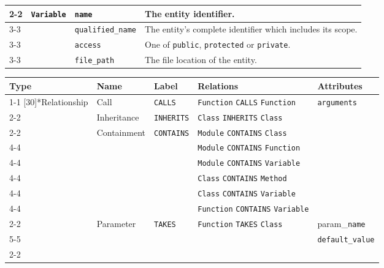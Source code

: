 \begin{tabularx}{\textwidth}{p{1.8cm}llX}
\cmidrule{2-2}\cmidrule{3-3}\cmidrule{4-4}
 & \multirow{4}[8]{*}{\texttt{Variable}} & \texttt{name} & The entity identifier. \\
\cmidrule{3-3}\cmidrule{4-4}
 &  & \texttt{qualified\_\texttt{name}} & The entity's complete identifier which includes its scope. \\
\cmidrule{3-3}\cmidrule{4-4}
 &  & \texttt{access} & One of \texttt{public}, \texttt{protected} or \texttt{private}. \\
\cmidrule{3-3}\cmidrule{4-4}
 &  & \texttt{file\_path} & The file location of the entity. \\
\bottomrule
\end{tabularx}

\begin{tabularx}{\textwidth}{p{1.8cm}llXl}
\toprule
\textbf{Type} & \textbf{Name} & \textbf{Label} & \textbf{Relations} & \textbf{Attributes} \\
\cmidrule{1-1}\cmidrule{2-2}\cmidrule{3-3}\cmidrule{4-4}\cmidrule{5-5}
\multirow{15}[30]{*}{Relationship} & Call & \texttt{CALLS} & \texttt{Function} \texttt{CALLS} \texttt{Function} & \texttt{arguments} \\
\cmidrule{2-2}\cmidrule{3-3}\cmidrule{4-4}\cmidrule{5-5}
 & Inheritance & \texttt{INHERITS} & \texttt{Class} \texttt{INHERITS} \texttt{Class} &  \\
\cmidrule{2-2}\cmidrule{3-3}\cmidrule{4-4}
 & \multirow{6}[12]{*}{Containment} & \multirow{6}[12]{*}{\texttt{CONTAINS}} & \texttt{Module} \texttt{CONTAINS} \texttt{Class} &  \\
\cmidrule{4-4}
 &  &  & \texttt{Module} \texttt{CONTAINS} \texttt{Function} &  \\
\cmidrule{4-4}
 &  &  & \texttt{Module} \texttt{CONTAINS} \texttt{Variable} &  \\
\cmidrule{4-4}
 &  &  & \texttt{Class} \texttt{CONTAINS} \texttt{Method} &  \\
\cmidrule{4-4}
 &  &  & \texttt{Class} \texttt{CONTAINS} \texttt{Variable} &  \\
\cmidrule{4-4}
 &  &  & \texttt{Function} \texttt{CONTAINS} \texttt{Variable} &  \\
\cmidrule{2-2}\cmidrule{3-3}\cmidrule{4-4}\cmidrule{5-5}
 & \multirow{2}[4]{*}{Parameter} & \multirow{2}[4]{*}{\texttt{TAKES}} & \multirow{2}[4]{*}{\texttt{Function} \texttt{TAKES} \texttt{Class}} & param\_\texttt{name} \\
\cmidrule{5-5}
 &  &  &  & \texttt{default\_value} \\
\cmidrule{2-2}\cmidrule{3-3}\cmidrule{4-4}\cmidrule{5-5}

\end{tabularx}
